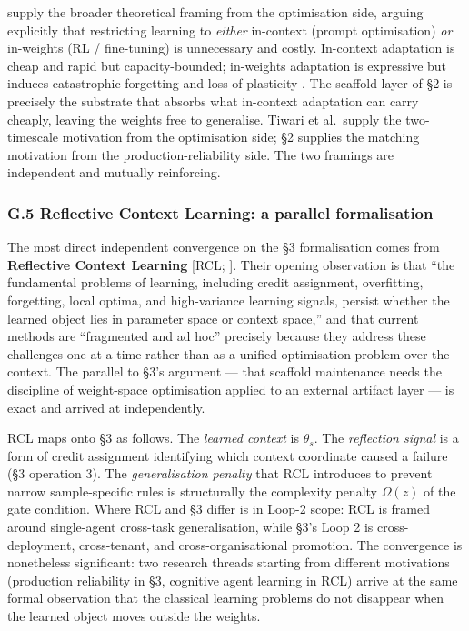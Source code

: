 \textbf{\citet{tiwari2026fastandslow}} supply the broader theoretical
framing from the optimisation side, arguing explicitly that restricting
learning to \emph{either} in-context (prompt optimisation) \emph{or}
in-weights (RL / fine-tuning) is unnecessary and costly. In-context
adaptation is cheap and rapid but capacity-bounded; in-weights
adaptation is expressive but induces catastrophic forgetting and loss of
plasticity \citep{dohare2024loss}. The scaffold layer of §2 is precisely
the substrate that absorbs what in-context adaptation can carry cheaply,
leaving the weights free to generalise. Tiwari et al.~supply the
two-timescale motivation from the optimisation side; §2 supplies the
matching motivation from the production-reliability side. The two
framings are independent and mutually reinforcing.

\subsubsection{G.5 Reflective Context Learning: a parallel
formalisation}\label{g.5-reflective-context-learning-a-parallel-formalisation}

The most direct independent convergence on the §3 formalisation comes
from \textbf{Reflective Context Learning} {[}RCL;
\citet{vassilyev2026rcl}{]}. Their opening observation is that ``the
fundamental problems of learning, including credit assignment,
overfitting, forgetting, local optima, and high-variance learning
signals, persist whether the learned object lies in parameter space or
context space,'' and that current methods are ``fragmented and ad hoc''
precisely because they address these challenges one at a time rather
than as a unified optimisation problem over the context. The parallel to
§3's argument --- that scaffold maintenance needs the discipline of
weight-space optimisation applied to an external artifact layer --- is
exact and arrived at independently.

RCL maps onto §3 as follows. The \emph{learned context} is \(\theta_s\).
The \emph{reflection signal} is a form of credit assignment identifying
which context coordinate caused a failure (§3 operation 3). The
\emph{generalisation penalty} that RCL introduces to prevent narrow
sample-specific rules is structurally the complexity penalty
\(\Omega(z)\) of the gate condition. Where RCL and §3 differ is in
Loop-2 scope: RCL is framed around single-agent cross-task
generalisation, while §3's Loop 2 is cross-deployment, cross-tenant, and
cross-organisational promotion. The convergence is nonetheless
significant: two research threads starting from different motivations
(production reliability in §3, cognitive agent learning in RCL) arrive
at the same formal observation that the classical learning problems do
not disappear when the learned object moves outside the weights.

